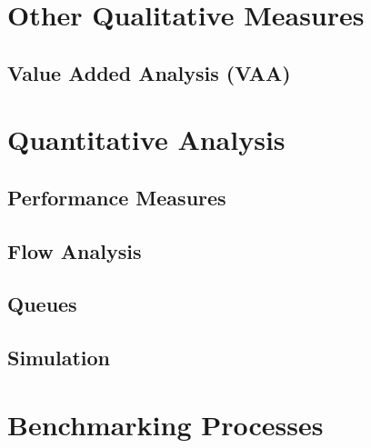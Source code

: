 \section{Other Qualitative Measures}

\subsection{Value Added Analysis (VAA)}

\section{Quantitative Analysis}
\subsection{Performance Measures}
\subsection{Flow Analysis}
\subsection{Queues}
\subsection{Simulation}

\section{Benchmarking Processes}

